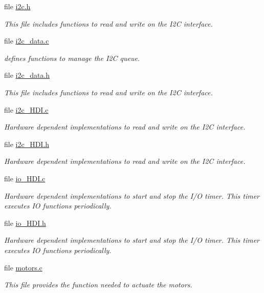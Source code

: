 \begin{DoxyCompactItemize}
file \hyperlink{i2c_8h}{i2c.\+h}
\begin{DoxyCompactList}\small\item\em This file includes functions to read and write on the I2\+C interface. \end{DoxyCompactList}\item 
file \hyperlink{i2c__data_8c}{i2c\+\_\+data.\+c}
\begin{DoxyCompactList}\small\item\em defines functions to manage the I2\+C queue. \end{DoxyCompactList}\item 
file \hyperlink{i2c__data_8h}{i2c\+\_\+data.\+h}
\begin{DoxyCompactList}\small\item\em This file includes functions to read and write on the I2\+C interface. \end{DoxyCompactList}\item 
file \hyperlink{i2c__HDI_8c}{i2c\+\_\+\+H\+D\+I.\+c}
\begin{DoxyCompactList}\small\item\em Hardware dependent implementations to read and write on the I2\+C interface. \end{DoxyCompactList}\item 
file \hyperlink{i2c__HDI_8h}{i2c\+\_\+\+H\+D\+I.\+h}
\begin{DoxyCompactList}\small\item\em Hardware dependent implementations to read and write on the I2\+C interface. \end{DoxyCompactList}\item 
file \hyperlink{io__HDI_8c}{io\+\_\+\+H\+D\+I.\+c}
\begin{DoxyCompactList}\small\item\em Hardware dependent implementations to start and stop the I/\+O timer. This timer executes I\+O functions periodically. \end{DoxyCompactList}\item 
file \hyperlink{io__HDI_8h}{io\+\_\+\+H\+D\+I.\+h}
\begin{DoxyCompactList}\small\item\em Hardware dependent implementations to start and stop the I/\+O timer. This timer executes I\+O functions periodically. \end{DoxyCompactList}\item 
file \hyperlink{motors_8c}{motors.\+c}
\begin{DoxyCompactList}\small\item\em This file provides the function needed to actuate the motors. \end{DoxyCompactList}\item 

\end{DoxyCompactItemize}

